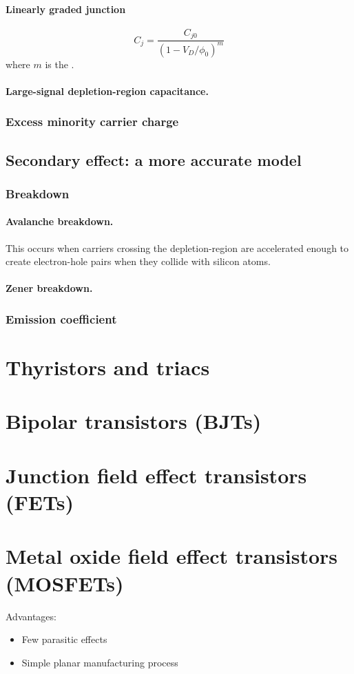 \documentclass{report}
\begin{document}
\paragraph{Linearly graded junction}
\[ C_j = \frac{C_{j0}}{(1-V_D/ \phi_0)^m} \]
where $m$ is the .
\paragraph{Large-signal depletion-region capacitance.}
\subsubsection{Excess minority carrier charge}
\subsection{Secondary effect: a more accurate model}
\subsubsection{Breakdown}
\paragraph{Avalanche breakdown.} This occurs when carriers crossing the depletion-region are accelerated enough to create electron-hole pairs when they collide with silicon atoms.
\paragraph{Zener breakdown.}
\subsubsection{Emission coefficient}
\section{Thyristors and triacs}
\section{Bipolar transistors (BJTs)}
\section{Junction field effect transistors (FETs)}
\section{Metal oxide field effect transistors (MOSFETs)}
Advantages:
\begin{itemize}
\item Few parasitic effects
\item Simple planar manufacturing process
\end{itemize}
\end{document}
